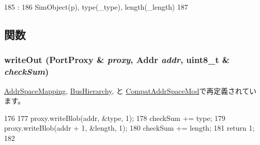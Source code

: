 \begin{DoxyCode}
185                                         :
186     SimObject(p), type(_type), length(_length)
187 {}

\end{DoxyCode}


\subsection{関数}
\hypertarget{classX86ISA_1_1IntelMP_1_1ExtConfigEntry_a5fffc1006b1f28bd779d83ffbe213b4f}{
\subsubsection[{writeOut}]{ writeOut ({\bf PortProxy} \& {\em proxy}, \/  {\bf Addr} {\em addr}, \/  uint8\_\-t \& {\em checkSum})}}
\label{classX86ISA_1_1IntelMP_1_1ExtConfigEntry_a5fffc1006b1f28bd779d83ffbe213b4f}


\hyperlink{classX86ISA_1_1IntelMP_1_1AddrSpaceMapping_a5fffc1006b1f28bd779d83ffbe213b4f}{AddrSpaceMapping}, \hyperlink{classX86ISA_1_1IntelMP_1_1BusHierarchy_a5fffc1006b1f28bd779d83ffbe213b4f}{BusHierarchy}, と \hyperlink{classX86ISA_1_1IntelMP_1_1CompatAddrSpaceMod_a5fffc1006b1f28bd779d83ffbe213b4f}{CompatAddrSpaceMod}で再定義されています。


\begin{DoxyCode}
176 {
177     proxy.writeBlob(addr, &type, 1);
178     checkSum += type;
179     proxy.writeBlob(addr + 1, &length, 1);
180     checkSum += length;
181     return 1;
182 }
\end{DoxyCode}


